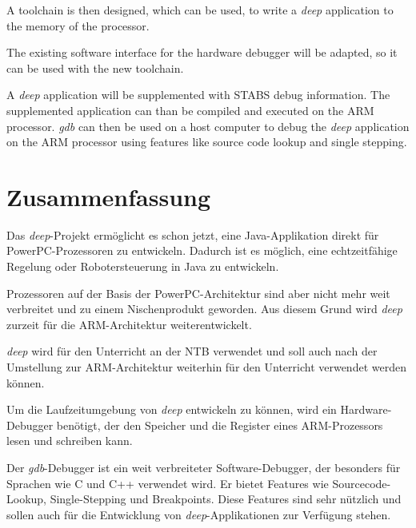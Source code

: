 A toolchain is then designed, which can be used, to write a \textit{deep} application to the memory of the processor.

The existing software interface for the hardware debugger will be adapted, so it can be used with the new toolchain.

A \textit{deep} application will be supplemented with STABS debug information.
The supplemented application can than be compiled and executed on the ARM processor.
\textit{gdb} can then be used on a host computer to debug the \textit{deep} application on the ARM processor using features like source code lookup and single stepping.



\chapter*{Zusammenfassung}
Das \textit{deep}-Projekt ermöglicht es schon jetzt, eine Java-Applikation direkt für PowerPC-Prozessoren zu entwickeln.
Dadurch ist es möglich, eine echtzeitfähige Regelung oder Robotersteuerung in Java zu entwickeln.

Prozessoren auf der Basis der PowerPC-Architektur sind aber nicht mehr weit verbreitet und zu einem Nischenprodukt geworden.
Aus diesem Grund wird \textit{deep} zurzeit für die ARM-Architektur weiterentwickelt.

\textit{deep} wird für den Unterricht an der NTB verwendet und soll auch nach der Umstellung zur ARM-Architektur weiterhin für den Unterricht verwendet werden können.

Um die Laufzeitumgebung von \textit{deep} entwickeln zu können, wird ein Hardware-Debugger benötigt, der den Speicher und die Register eines ARM-Prozessors lesen und schreiben kann.

Der \textit{gdb}-Debugger ist ein weit verbreiteter Software-Debugger, der besonders für Sprachen wie C und C++ verwendet wird.
Er bietet Features wie Sourcecode-Lookup, Single-Stepping und Breakpoints.
Diese Features sind sehr nützlich und sollen auch für die Entwicklung von \textit{deep}-Applikationen zur Verfügung stehen.

